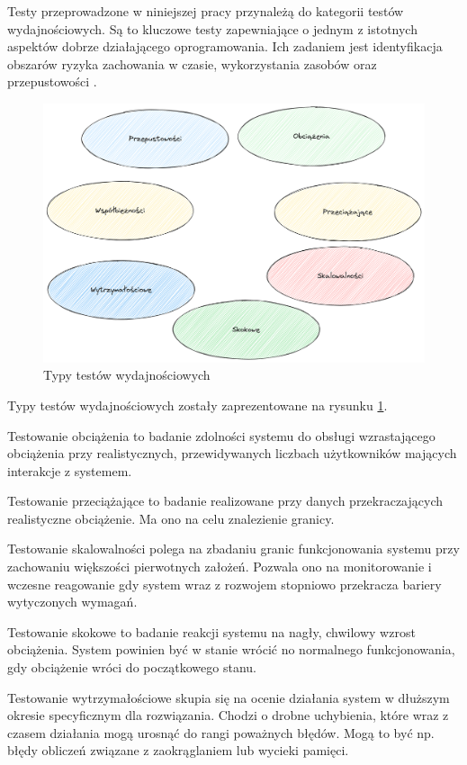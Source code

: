 Testy przeprowadzone w niniejszej pracy przynależą do kategorii testów wydajnościowych.
Są to kluczowe testy zapewniające o jednym z istotnych aspektów dobrze działającego oprogramowania.
Ich zadaniem jest identyfikacja obszarów ryzyka zachowania w czasie, wykorzystania zasobów oraz przepustowości \cite{testerzyTestowanieWydajnoci}.

\begin{figure}[!hb]
	\centering \includegraphics[width=1\linewidth]{rysunki/performance-tests.png}
	\caption{Typy testów wydajnościowych}
	\label{rys:performance-tests}
\end{figure}

Typy testów wydajnościowych zostały zaprezentowane na rysunku \ref{rys:performance-tests}.

Testowanie obciążenia to badanie zdolności systemu do obsługi wzrastającego obciążenia przy realistycznych, przewidywanych liczbach użytkowników mających interakcje z systemem.

Testowanie przeciążające to badanie realizowane przy danych przekraczających realistyczne obciążenie. 
Ma ono na celu znalezienie granicy.

Testowanie skalowalności polega na zbadaniu granic funkcjonowania systemu przy zachowaniu większości pierwotnych założeń.
Pozwala ono na monitorowanie i wczesne reagowanie gdy system wraz z rozwojem stopniowo przekracza bariery wytyczonych wymagań.

Testowanie skokowe to badanie reakcji systemu na nagły, chwilowy wzrost obciążenia.
System powinien być w stanie wrócić no normalnego funkcjonowania, gdy obciążenie wróci do początkowego stanu.

Testowanie wytrzymałościowe skupia się na ocenie działania system w dłuższym okresie specyficznym dla rozwiązania.
Chodzi o drobne uchybienia, które wraz z czasem działania mogą urosnąć do rangi poważnych błędów.
Mogą to być np. błędy obliczeń związane z zaokrąglaniem lub wycieki pamięci.

